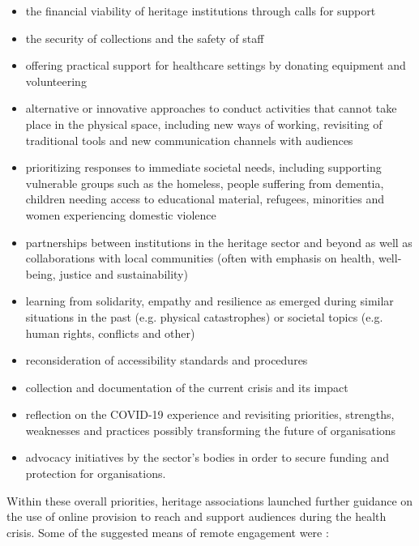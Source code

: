 \documentclass{egpubl}
\begin{document}
\begin{itemize}
\item the financial viability of heritage institutions through calls for support
\item the security of collections and the safety of staff
\item offering practical support for healthcare settings by donating equipment and volunteering 
\item alternative or innovative approaches to conduct activities that cannot take place in the physical space, including new ways of working, revisiting of traditional tools and new communication channels with audiences
\item prioritizing responses to immediate societal needs, including supporting vulnerable groups such as the homeless, people suffering from dementia, children needing access to educational material, refugees, minorities and women experiencing domestic violence
\item partnerships between institutions in the heritage sector and beyond as well as collaborations with local communities (often with emphasis on health, well-being, justice and sustainability)
\item learning from solidarity, empathy and resilience as emerged during similar situations in the past (e.g. physical catastrophes) or societal topics (e.g. human rights, conflicts and other)
\item reconsideration of accessibility standards and procedures
\item collection and documentation of the current crisis and its impact
\item reflection on the COVID-19 experience and revisiting priorities, strengths, weaknesses and practices possibly transforming the future of organisations
\item advocacy initiatives by the sector's bodies in order to secure funding and protection for organisations.
\end{itemize}

Within these overall priorities, heritage associations launched further guidance on the use of online provision to reach and support audiences during the health crisis. Some of the suggested means of remote engagement were \cite{InternationalCouncilofMuseums2020,Ciecko2020,NetworkofEuropeanMuseumOrganisations20201}:
\end{document}

